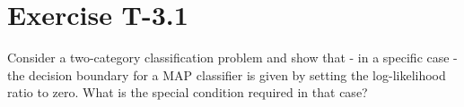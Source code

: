 \section*{Exercise T-3.1}

Consider a two-category classification problem and show that - in a
specific case - the decision boundary for a MAP classifier is given by
setting the log-likelihood ratio to zero. What is the special condition
required in that case?
